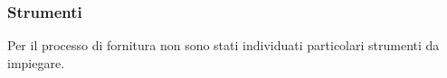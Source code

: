 %
%			
\subsubsection{Strumenti}
		Per il processo di fornitura non sono stati individuati particolari strumenti da impiegare.